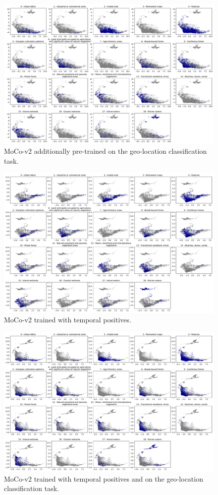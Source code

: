 \begin{figure}[htbp]
  \centering
   \includegraphics[width=\linewidth]{figures/all_labels_geo.pdf}
   \caption{MoCo-v2 additionally pre-trained on the geo-location classification task.}
\end{figure}

\begin{figure}[htbp]
  \centering
   \includegraphics[width=\linewidth]{figures/all_labels_tp.pdf}
   \caption{MoCo-v2 trained with temporal positives.}
\end{figure}

\begin{figure}[htbp]
  \centering
   \includegraphics[width=\linewidth]{figures/all_labels_geo+tp.pdf}
   \caption{MoCo-v2 trained with temporal positives and on the geo-location classification task.}
\end{figure}
